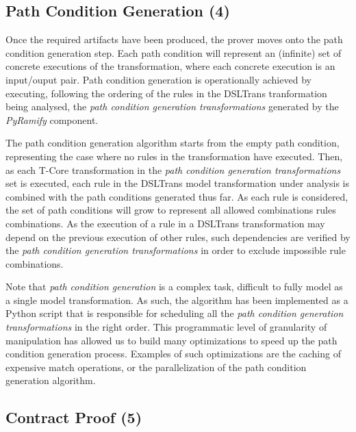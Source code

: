 \subsection{Path Condition Generation (4)}
\label{sec:path_cond_gen}

Once the required artifacts have been produced, the prover moves onto the path
condition generation step. Each path condition will represent an (infinite) set
of concrete executions of the transformation, where each concrete execution is an
input/ouput pair. Path condition generation is operationally achieved by
executing, following the ordering of the rules in the DSLTrans
tranformation being analysed, the \emph{path condition generation transformations} generated by the
\emph{PyRamify} component. 

The path condition generation algorithm starts from the empty path condition,
representing the case where no rules in the transformation have executed. Then,
as each T-Core transformation in the \emph{path condition generation
transformations} set is executed, each rule in the DSLTrans model transformation
under analysis is combined with the path conditions generated thus far. As each
rule is considered, the set of path conditions will grow
to represent all allowed combinations rules combinations. As the execution of a
rule in a DSLTrans transformation may depend on the previous execution of other rules,
such dependencies are verified by the \emph{path condition generation
transformations} in order to exclude impossible rule combinations.


Note that \emph{path condition generation} is a complex task, difficult to fully
model as a single model transformation. As such, the algorithm
has been implemented as a Python script that is responsible for scheduling all the
\emph{path condition generation transformations} in the right order. This programmatic level of granularity of
manipulation has allowed us to build many optimizations to speed up the path
condition generation process. Examples of such optimizations are the caching of
expensive match operations, or the parallelization of the path condition generation algorithm. 

\subsection{Contract Proof (5)}

